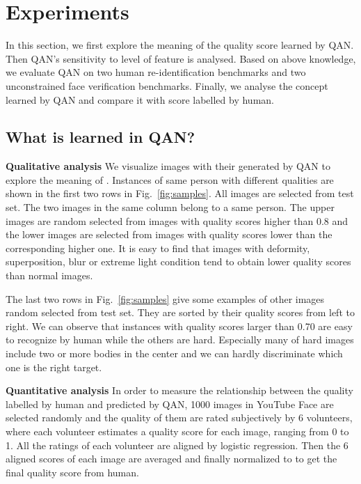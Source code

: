 \documentclass[10pt,twocolumn,letterpaper]{article}
\begin{document}
\section{Experiments}
\label{others}
In this section, we first explore the meaning of the quality score learned by QAN. Then QAN's sensitivity to level of feature is analysed. Based on above knowledge, we evaluate QAN on two human re-identification benchmarks and two unconstrained face verification benchmarks. Finally, we analyse the concept learned by QAN and compare it with score labelled by human.




\subsection{What is learned in QAN?}


\textbf{Qualitative analysis} 
We visualize images with their  generated by QAN to explore the meaning of . Instances of same person with different qualities are shown in the first two rows in Fig.~\ref{fig:samples}. All images are selected from test set. The two images in the same column belong to a same person. The upper images are random selected from images with quality scores higher than 0.8 and the lower images are selected from images with quality scores lower than the corresponding higher one. It is easy to find that images with deformity, superposition, blur or extreme light condition tend to obtain lower quality scores than normal images.

The last two rows in Fig.~\ref{fig:samples} give some examples of other images random selected from test set. They are sorted by their quality scores from left to right. We can observe that instances with quality scores larger than 0.70 are easy to recognize by human while the others are hard. Especially many of hard images include two or more bodies in the center and we can hardly discriminate which one is the right target. 

\textbf{Quantitative analysis} 
In order to measure the relationship between the quality labelled by human and  predicted by QAN, 1000 images in YouTube Face are selected randomly and the quality of them are rated subjectively by 6 volunteers, where each volunteer estimates a quality score for each image, ranging from 0 to 1. All the ratings of each volunteer are aligned by logistic regression. Then the 6 aligned scores of each image are averaged and finally normalized to  to get the final quality score from human. 
\end{document}
